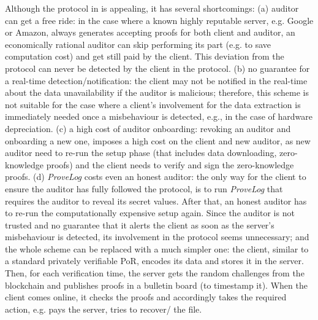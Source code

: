 Although the protocol in  \cite{armknecht2014outsourced}  is appealing, it has  several shortcomings: (a) auditor can get a free ride: in the case where a known highly reputable  server, e.g. Google or Amazon, always generates   accepting proofs for both client and auditor, an economically rational auditor can skip performing its part (e.g. to save computation cost) and get still paid by the client. This deviation from the protocol can never be detected by the client in the protocol.  (b) no guarantee for a real-time detection/notification: the client may not be notified in the real-time about the data unavailability if the auditor is malicious; therefore, this scheme is not suitable for the case where a client's involvement for the data extraction is  immediately needed once a misbehaviour is detected, e.g., in the case of hardware depreciation. (c) a high cost of auditor onboarding:  revoking an auditor and onboarding a new one, imposes a high cost on the client and new auditor, as new auditor need to re-run the setup phase (that includes data downloading, zero-knowledge proofs) and the client needs to verify and sign the zero-knowledge proofs. (d) \textit{ProveLog} costs even an honest auditor: the only way for the client to ensure the auditor has fully followed the protocol, is to run \textit{ProveLog} that requires the auditor to reveal its secret values. After that,  an honest auditor has to re-run the computationally expensive setup  again. Since the auditor is not trusted and no guarantee that it alerts the client as soon as the server's misbehaviour is detected, its involvement in the protocol seems unnecessary; and the whole scheme can be replaced with a much simpler one: the client, similar to a standard privately verifiable PoR, encodes its data and stores it in the server. Then, for each verification time, the server gets the random challenges from the blockchain and publishes  proofs in a bulletin board (to timestamp it). When the client comes online, it checks the proofs and accordingly takes the required action, e.g. pays the server, tries to recover/ the file.

